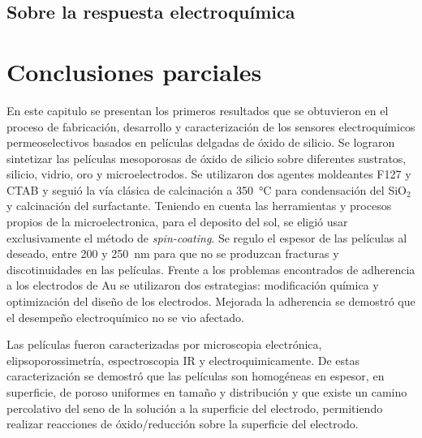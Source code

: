 	\subsection{Sobre la respuesta electroquímica}

\section{Conclusiones parciales}

	En este capitulo se presentan los primeros resultados que se obtuvieron en el proceso de fabricación, desarrollo y caracterización de los sensores electroquímicos permeoselectivos basados en películas delgadas de óxido de silicio. Se lograron sintetizar las películas mesoporosas de óxido de silicio sobre diferentes sustratos, silicio, vidrio, oro y microelectrodos. Se utilizaron dos agentes moldeantes F127 y CTAB y seguió la vía clásica de calcinación a \SI{350}{\celsius} para condensación del SiO$_2$ y calcinación del surfactante. Teniendo en cuenta las herramientas y procesos propios de la microelectronica, para el deposito del sol, se eligió usar exclusivamente el método de \textit{spin-coating}. Se regulo el espesor de las películas al deseado, entre 200 y \SI{250}{\nm} para que no se produzcan fracturas y discotinuidades en las películas. Frente a los problemas encontrados de adherencia a los electrodos de Au se utilizaron dos estrategias: modificación química y optimización del diseño de los electrodos. Mejorada la adherencia se demostró que el desempeño electroquímico no se vio afectado. 

	Las películas fueron caracterizadas por microscopia electrónica, elipsoporossimetría, espectroscopia IR y electroquimicamente. De estas caracterización se demostró que las películas son homogéneas en espesor, en superficie, de poroso uniformes en tamaño y distribución y que existe un camino percolativo del seno de la solución a la superficie del electrodo, permitiendo realizar reacciones de óxido/reducción sobre la superficie del electrodo.




